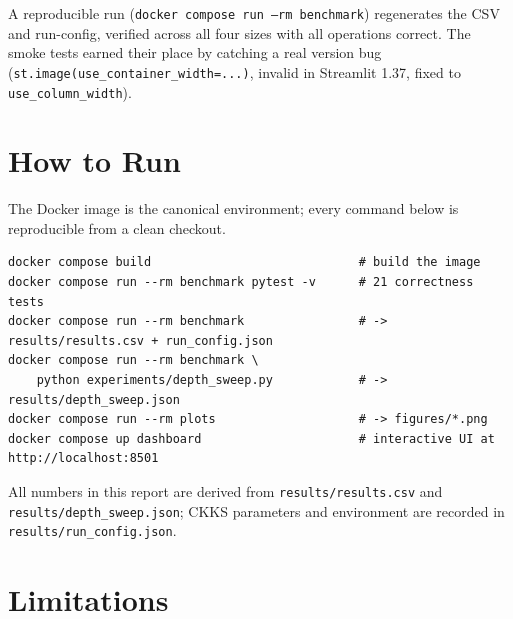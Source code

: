 \documentclass[11pt,a4paper]{article}
\begin{document}
A reproducible run (\texttt{docker compose run --rm benchmark}) regenerates the
CSV and run-config, verified across all four sizes with all operations correct.
The smoke tests earned their place by catching a real version bug
(\texttt{st.image(use\_container\_width=...)}, invalid in Streamlit 1.37, fixed to
\texttt{use\_column\_width}).

\section{How to Run}

The Docker image is the canonical environment; every command below is
reproducible from a clean checkout.

\begin{lstlisting}[caption={Reproduction commands.},captionpos=b]
docker compose build                             # build the image
docker compose run --rm benchmark pytest -v      # 21 correctness tests
docker compose run --rm benchmark                # -> results/results.csv + run_config.json
docker compose run --rm benchmark \
    python experiments/depth_sweep.py            # -> results/depth_sweep.json
docker compose run --rm plots                    # -> figures/*.png
docker compose up dashboard                      # interactive UI at http://localhost:8501
\end{lstlisting}

All numbers in this report are derived from \texttt{results/results.csv} and
\texttt{results/depth\_sweep.json}; CKKS parameters and environment are recorded
in \texttt{results/run\_config.json}.

\section{Limitations}
\label{sec:limitations}
\end{document}

